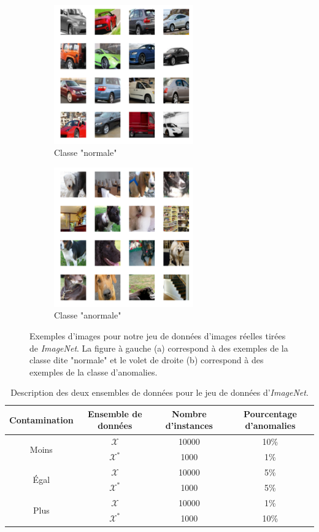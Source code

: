 \begin{figure}[htb]
	\centering
	\begin{subfigure}{6cm}
		\centering\includegraphics[width=6cm]{images/imagenet-inliers}
		\caption{Classe "normale"}
	\end{subfigure}
	\begin{subfigure}{6cm}
		\centering\includegraphics[width=6cm]{images/imagenet-outliers}
		\caption{Classe "anormale"}
	\end{subfigure}
	\DIFdelbeginFL %
\DIFdelendFL \DIFaddbeginFL \caption[Exemples d'images pour notre jeu de données d'images réelles tirées de \textit{ImageNet}.]{\DIFaddendFL Exemples d'images pour notre jeu de données d'images réelles tirées de \textit{ImageNet}. La figure à gauche (a) correspond à des exemples de la classe dite "normale" et le volet de droite (b) correspond à des exemples de la classe d'anomalies.}
	\label{fig:imagenet}
\end{figure}

\begin{table}[h]
	\centering
	\caption{Description des deux ensembles de données pour le jeu de données d'\textit{ImageNet}.}
	\begin{tabular}{| c | c | c | c |}
		\hline
		\rowcolor{Gray}
		Contamination & Ensemble de données  & Nombre d'instances & Pourcentage d'anomalies  \\
		\hline
		\multirow{2}{*}{Moins} 
		& $\mathcal{X}$ & 10000 & 10\%  \\
		& $\mathcal{X^*}$  & 1000 & 1\%  \\ 
		\midrule
		\multirow{2}{*}{Égal} 
		& $\mathcal{X}$ & 10000 & 5\%  \\
		& $\mathcal{X^*}$  & 1000 & 5\%  \\ 
		\midrule
		\multirow{2}{*}{Plus} 
		& $\mathcal{X}$ & 10000 & 1\%  \\
		& $\mathcal{X^*}$  & 1000 & 10\%  \\ 
		\midrule
	\end{tabular}
	\label{tab:dataset1}
\end{table}

